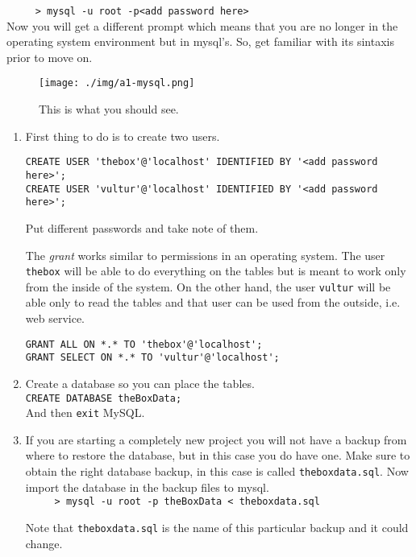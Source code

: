 \begin{enumerate}
  \verb=     > mysql -u root -p<add password here>=\\
  Now you will get a different prompt which means that you are no longer in the operating system environment but in mysql's. So, get familiar with
  its sintaxis prior to move on.
  \begin{figure}[h!]
 \centering
 \texttt{[image: ./img/a1-mysql.png]}
 \caption{This is what you should see.}
 \label{fig:a1-mysql}
\end{figure}
\begin{enumerate}
 \item First thing to do is to create two users.
  \begin{verbatim}
CREATE USER 'thebox'@'localhost' IDENTIFIED BY '<add password here>';
CREATE USER 'vultur'@'localhost' IDENTIFIED BY '<add password here>';
\end{verbatim}
Put different passwords and take note of them.

The \emph{grant} works similar to permissions in an operating system. The user \verb=thebox= will be able to do everything on the tables but is meant to
work only from the inside of the system. On the other hand, the user \verb=vultur= will be able only to read the tables and that user can be used from
the outside, i.e. web service.
\begin{verbatim}
GRANT ALL ON *.* TO 'thebox'@'localhost';
GRANT SELECT ON *.* TO 'vultur'@'localhost';
\end{verbatim}



\item Create a database so you can place the tables.\\ \verb=CREATE DATABASE theBoxData;=\\
And then \verb=exit= MySQL.

\item If you are starting a completely new project you will not have a backup from where to restore the database, but in this case you do have one. 
Make sure to obtain the right database backup, in this case is called \verb=theboxdata.sql=.
Now import the database in the backup files to mysql.\\
\verb=     > mysql -u root -p theBoxData < theboxdata.sql=

Note that \verb=theboxdata.sql= is the name of this particular backup and it could change.



\end{enumerate}
\end{enumerate}
